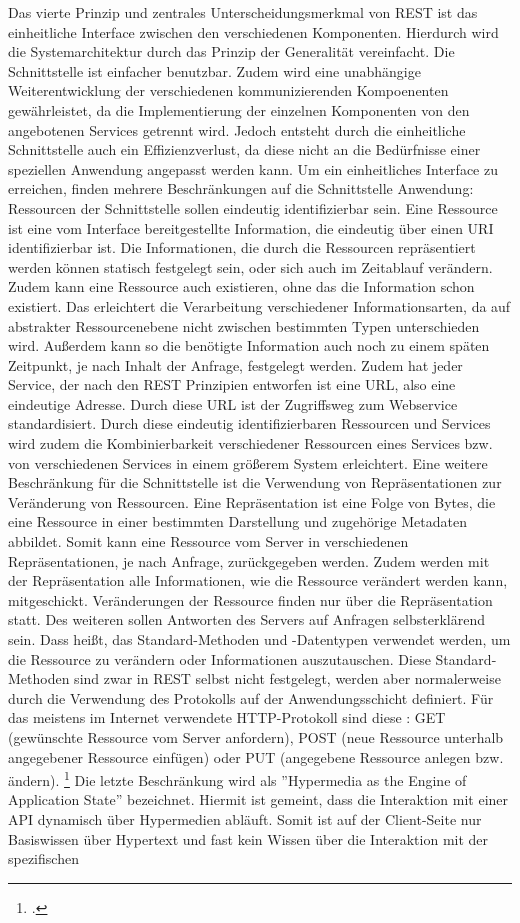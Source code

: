 Das vierte Prinzip und zentrales Unterscheidungsmerkmal von REST ist das einheitliche Interface zwischen den verschiedenen Komponenten. Hierdurch wird die Systemarchitektur durch das Prinzip der Generalität vereinfacht. Die Schnittstelle ist einfacher benutzbar. Zudem wird eine unabhängige Weiterentwicklung der verschiedenen kommunizierenden Kompoenenten gewährleistet, da die Implementierung der einzelnen Komponenten von den angebotenen Services getrennt wird. Jedoch entsteht durch die einheitliche Schnittstelle auch ein Effizienzverlust, da diese nicht an die Bedürfnisse einer speziellen Anwendung angepasst werden kann.
Um ein einheitliches Interface zu erreichen, finden mehrere Beschränkungen auf die Schnittstelle Anwendung: Ressourcen der Schnittstelle sollen eindeutig identifizierbar sein. Eine Ressource ist eine vom Interface bereitgestellte Information, die eindeutig über einen URI identifizierbar ist. Die Informationen, die durch die Ressourcen repräsentiert werden können statisch festgelegt sein, oder sich auch im Zeitablauf verändern. Zudem kann eine Ressource auch existieren, ohne das die Information schon existiert. Das erleichtert die Verarbeitung verschiedener Informationsarten, da auf abstrakter Ressourcenebene nicht zwischen bestimmten Typen unterschieden wird. Au{\ss}erdem kann so die benötigte Information auch noch zu einem späten Zeitpunkt, je nach Inhalt der Anfrage, festgelegt werden. Zudem hat jeder Service, der nach den REST Prinzipien entworfen ist eine URL, also eine eindeutige Adresse. Durch diese URL ist der Zugriffsweg zum Webservice standardisiert. Durch diese eindeutig identifizierbaren Ressourcen und Services wird zudem die Kombinierbarkeit verschiedener Ressourcen eines Services bzw. von verschiedenen Services in einem grö{\ss}erem System erleichtert. Eine weitere Beschränkung für die Schnittstelle ist die Verwendung von Repräsentationen zur Veränderung von Ressourcen. Eine Repräsentation ist eine Folge von Bytes, die eine Ressource in einer bestimmten Darstellung und zugehörige Metadaten abbildet. Somit kann eine Ressource vom Server in verschiedenen Repräsentationen, je nach Anfrage, zurückgegeben werden. Zudem werden mit der Repräsentation alle Informationen, wie die Ressource verändert werden kann, mitgeschickt. Veränderungen der Ressource finden nur über die Repräsentation statt. Des weiteren sollen Antworten des Servers auf Anfragen selbsterklärend sein. Dass hei{\ss}t, das Standard-Methoden und -Datentypen verwendet werden, um die Ressource zu verändern oder Informationen auszutauschen. Diese Standard-Methoden sind zwar in REST selbst nicht festgelegt, werden aber normalerweise durch die Verwendung des Protokolls auf der Anwendungsschicht definiert. Für das meistens im Internet verwendete HTTP-Protokoll sind diese \zB: GET (gewünschte Ressource vom Server anfordern), POST (neue Ressource unterhalb angegebener Ressource einfügen) oder PUT (angegebene Ressource anlegen bzw. ändern). \footcite[Vgl.][]{fielding_architectural_2000} Die letzte Beschränkung wird als ''Hypermedia as the Engine of Application State'' bezeichnet. Hiermit ist gemeint, dass die Interaktion mit einer API dynamisch über Hypermedien abläuft. Somit ist auf der Client-Seite nur Basiswissen über Hypertext und fast kein Wissen über die Interaktion mit der spezifischen 
